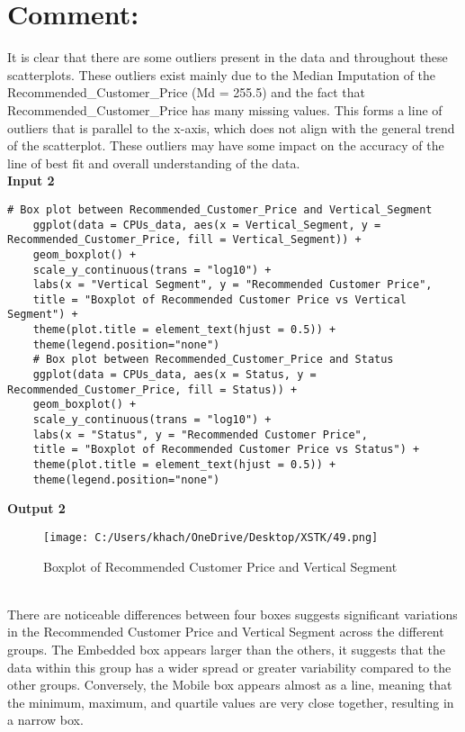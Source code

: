 \documentclass[a4paper]{article}
\begin{document}
	\section*{Comment:}
	It is clear that there are some outliers present in the data and throughout these scatterplots. These outliers exist mainly due to the Median Imputation of the Recommended\_Customer\_Price (Md = 255.5) and the fact that Recommended\_Customer\_Price has many missing values. This forms a line of outliers that is parallel to the x-axis, which does not align with the general trend of the scatterplot. These outliers may have some impact on the accuracy of the line of best fit and overall understanding of the data. \\
	\textbf{Input 2}
	\begin{lstlisting}[frame=single, backgroundcolor=\color{gray!10}, breaklines=true, columns=fullflexible]
	# Box plot between Recommended_Customer_Price and Vertical_Segment
	ggplot(data = CPUs_data, aes(x = Vertical_Segment, y = Recommended_Customer_Price, fill = Vertical_Segment)) +
	geom_boxplot() +
	scale_y_continuous(trans = "log10") +
	labs(x = "Vertical Segment", y = "Recommended Customer Price", 
	title = "Boxplot of Recommended Customer Price vs Vertical Segment") +
	theme(plot.title = element_text(hjust = 0.5)) +
	theme(legend.position="none")
	# Box plot between Recommended_Customer_Price and Status
	ggplot(data = CPUs_data, aes(x = Status, y = Recommended_Customer_Price, fill = Status)) +
	geom_boxplot() +
	scale_y_continuous(trans = "log10") +
	labs(x = "Status", y = "Recommended Customer Price", 
	title = "Boxplot of Recommended Customer Price vs Status") +
	theme(plot.title = element_text(hjust = 0.5)) +
	theme(legend.position="none")
	\end{lstlisting}
	\newpage
	\textbf{Output 2}
	\begin{figure}[htbp]
		\centering
		\begin{adjustbox}{width=0.5\textwidth, frame}
			\texttt{[image: C:/Users/khach/OneDrive/Desktop/XSTK/49.png]}
		\end{adjustbox}
		\captionsetup{justification=centering}
		\vspace{0.5cm}
		\caption{Boxplot of Recommended Customer Price and Vertical Segment}
	\end{figure}
	\\
	There are noticeable differences between four boxes suggests significant variations in the Recommended Customer Price and Vertical Segment across the different groups. The Embedded box appears larger than the others, it suggests that the data within this group has a wider spread or greater variability compared to the other groups. Conversely, the Mobile box appears almost as a line, meaning that the minimum, maximum, and quartile values are very close together, resulting in a narrow box.
\end{document}
